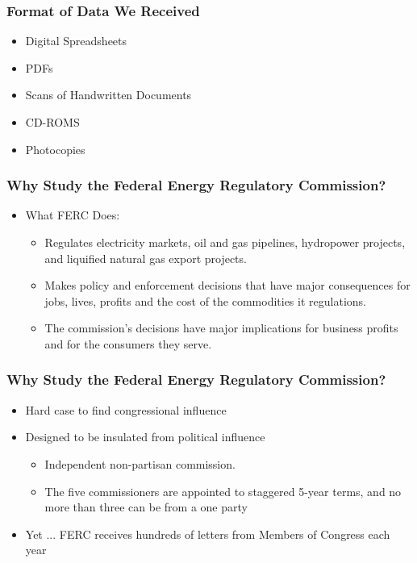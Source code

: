 \documentclass[13pt]{beamer}
\begin{document}
\begin{frame}
\frametitle{Format of Data We Received}
\begin{itemize}
\item Digital Spreadsheets
\item PDFs
\item Scans of Handwritten Documents
\item CD-ROMS
\item Photocopies
\end{itemize}
\end{frame}

\begin{frame} 
\frametitle{Why Study the Federal Energy Regulatory Commission?}
\Large
\begin{itemize}
\item What FERC Does:
\begin{itemize}
\item Regulates electricity markets, oil and gas pipelines, hydropower projects, and liquified natural gas export projects. 
\item Makes policy and enforcement decisions that have major consequences for jobs, lives, profits and the cost of the commodities it regulations. 
\item The commission's decisions have major implications for business profits and for the consumers they serve. 
\end{itemize}
\end{itemize}

\end{frame}
\begin{frame} 
\frametitle{Why Study the Federal Energy Regulatory Commission?}
\Large
\begin{itemize}
\item Hard case to find congressional influence
\item Designed to be insulated from political influence
\begin{itemize}
\item Independent non-partisan commission. 
\item The five commissioners are appointed to staggered 5-year terms, and no more than three can be from a one party

\end{itemize}
\item Yet ... FERC receives hundreds of letters from Members of Congress each year
\end{itemize}

\end{frame}
\end{document}
